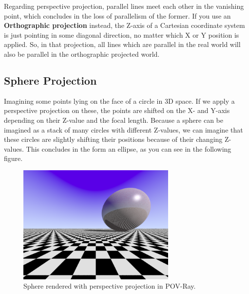 \documentclass[a4paper,12pt]{article}
\begin{document}
	Regarding perspective projection, parallel lines meet each other in the vanishing point, which concludes in the loss of parallelism of the former. If you use an \textbf{Orthographic projection} instead, the Z-axis of a Cartesian coordinate system is just pointing in some diagonal direction, no matter which X or Y position is applied. So, in that projection, all lines which are parallel in the real world will also be parallel in the orthographic projected world.

	
	\subsection{Sphere Projection}
	
	Imagining some points lying on the face of a circle in 3D space. If we apply a perspective projection on these, the points are shifted on the X- and Y-axis depending on their Z-value and the focal length. Because a sphere can be imagined as a stack of many circles with different Z-values, we can imagine that these circles are slightly shifting their positions because of their changing Z-values. This concludes in the form an ellipse, as you can see in the following figure.
	
	\begin{figure}[h!]
		\centering
		\includegraphics[width=0.7\textwidth]{E03.png}
		\caption{Sphere rendered with perspective projection in POV-Ray.}
	\end{figure}
	
	
\end{document}

